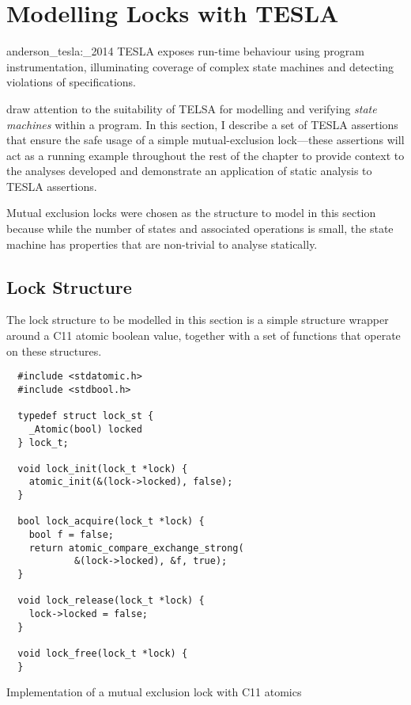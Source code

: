 \section{Modelling Locks with TESLA} \label{sec:locks}

\begin{displaycquote}[p. 1]{anderson_tesla:_2014}
TESLA exposes run-time behaviour using program instrumentation, illuminating
coverage of complex state machines and detecting violations of specifications.
\end{displaycquote}

\textcite{anderson_tesla:_2014} draw attention to the suitability of TELSA for
modelling and verifying \emph{state machines} within a program. In this section,
I describe a set of TESLA assertions that ensure the safe usage of a simple
mutual-exclusion lock---these assertions will act as a running example
throughout the rest of the chapter to provide context to the analyses developed
and demonstrate an application of static analysis to TESLA assertions.

Mutual exclusion locks were chosen as the structure to model in this section
because while the number of states and associated operations is small, the state
machine has properties that are non-trivial to analyse statically.

\subsection{Lock Structure}

The lock structure to be modelled in this section is a simple structure wrapper
around a C11 atomic boolean value, together with a set of functions that operate
on these structures.

\begin{listing}[ht]
  \begin{verbatim}
  #include <stdatomic.h>
  #include <stdbool.h>

  typedef struct lock_st {
    _Atomic(bool) locked
  } lock_t;

  void lock_init(lock_t *lock) {
    atomic_init(&(lock->locked), false);
  }

  bool lock_acquire(lock_t *lock) {
    bool f = false;
    return atomic_compare_exchange_strong(
            &(lock->locked), &f, true);
  }

  void lock_release(lock_t *lock) {
    lock->locked = false;
  }

  void lock_free(lock_t *lock) {
  }
  \end{verbatim}
  \caption{Implementation of a mutual exclusion lock with C11 atomics}
  \label{lst:mutex}
\end{listing}

